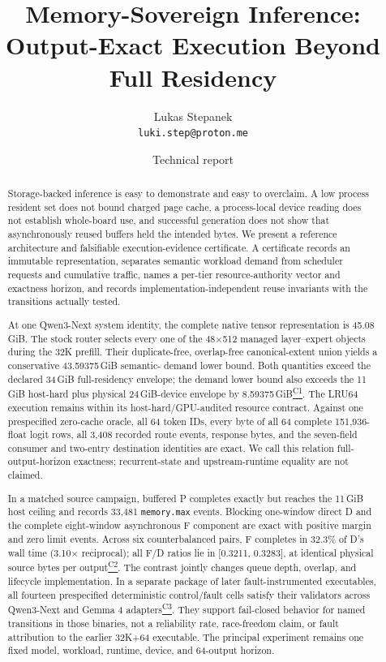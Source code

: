 \documentclass[letterpaper,twocolumn,10pt]{article}
\newcommand{\GiB}{\,GiB\xspace}
\newcommand{\claimref}[1]{\hyperlink{claim:#1}{\textsuperscript{\textsf{#1}}}}
\begin{document}
\title{Memory-Sovereign Inference:\\[-0.15em]Output-Exact Execution Beyond Full Residency}
\author{Lukas Stepanek\\\texttt{luki.step@proton.me}}
\date{Technical report}
\maketitle

\begin{abstract}
Storage-backed inference is easy to demonstrate and easy to overclaim.  A low
process resident set does not bound charged page cache, a process-local device
reading does not establish whole-board use, and successful generation does not
show that asynchronously reused buffers held the intended bytes.  We present
a reference architecture and falsifiable execution-evidence certificate.  A
certificate records an immutable representation, separates
semantic workload demand from scheduler requests and cumulative traffic, names
a per-tier resource-authority vector and exactness horizon, and records
implementation-independent reuse invariants with the transitions actually
tested.

At one Qwen3-Next system identity, the complete native tensor representation is
45.08\GiB.  The stock router selects every one of the 48$\times$512 managed
layer--expert objects during the 32K prefill.  Their duplicate-free,
overlap-free canonical-extent union yields a conservative 43.59375\GiB semantic-
demand lower bound.  Both quantities exceed the declared 34\GiB full-residency
envelope; the demand lower bound also exceeds the 11\GiB host-hard plus physical
24\GiB-device envelope by 8.59375\GiB\claimref{C1}.  The LRU64 execution
remains within its host-hard/GPU-audited resource contract.  Against one
prespecified zero-cache oracle, all 64 token IDs, every byte of all 64 complete
151,936-float logit rows, all 3,408 recorded route events, response bytes, and
the seven-field consumer and two-entry destination identities are exact.  We
call this relation full-output-horizon
exactness; recurrent-state and upstream-runtime equality are not claimed.

In a matched source campaign, buffered P completes exactly but reaches the
11\GiB host ceiling and records 33,481 \texttt{memory.max} events.  Blocking
one-window direct D and the complete eight-window asynchronous F component are
exact with positive margin and zero limit events.  Across six counterbalanced
pairs, F completes in 32.3\% of D's wall time (3.10$\times$ reciprocal); all
F/D ratios lie in [0.3211, 0.3283], at identical physical source bytes per
output\claimref{C2}.  The contrast jointly changes queue depth, overlap, and
lifecycle implementation.  In a separate package of later fault-instrumented
executables, all fourteen
prespecified deterministic control/fault cells satisfy their validators across
Qwen3-Next and Gemma 4 adapters\claimref{C3}.  They support fail-closed behavior
for named transitions in those binaries, not a reliability rate, race-freedom
claim, or fault attribution to the earlier 32K+64 executable.  The principal
experiment remains one fixed model, workload, runtime, device, and 64-output
horizon.
\end{abstract}
\end{document}
